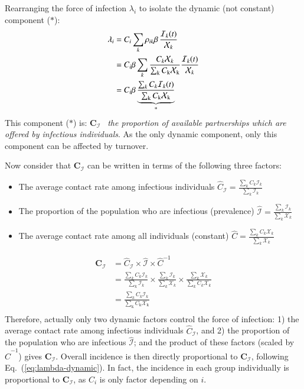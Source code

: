 Rearranging the force of infection $\lambda_i$
to isolate the dynamic (not constant) component ($*$):
\begin{equation}\label{eq:lambda-dynamic}
\begin{aligned}
  \lambda_i
    &= C_i \sum_k \rho_{ik} \beta \thinspace \frac{\mathcal{I}_k(t)}{\mathcal{X}_k}\\
    &= C_i \beta \sum_k
    \frac{C_k \mathcal{X}_k}{\sum_{\mathrm{k}}C_{\mathrm{k}}\mathcal{X}_{\mathrm{k}}}
    \frac{\mathcal{I}_k(t)}{\mathcal{X}_k}\\
    &= C_i \beta \underbrace{
      \frac{\sum_k C_k \mathcal{I}_k(t)}{\sum_{\mathrm{k}}C_{\mathrm{k}}\mathcal{X}_{\mathrm{k}}}
    }_{\text{*}}
\end{aligned}
\end{equation}
This component ($*$) is:
$\bm{C}_{\mathcal{I}}$~%
\textit{the proportion of available partnerships which are offered by infectious individuals}.
As the only dynamic component, only this component can be affected by turnover.
\par
Now consider that $\bm{C}_{\mathcal{I}}$
can be written in terms of the following three factors:
\begin{itemize}
  \item The average contact rate among infectious individuals
  $\hat{C}_{\mathcal{I}} = \frac{\sum_k C_k \mathcal{I}_k}{\sum_k \mathcal{I}_k}$
  \item The proportion of the population who are infectious (prevalence)
  $\hat{\mathcal{I}} = \frac{\sum_k \mathcal{I}_k}{\sum_k \mathcal{X}_k}$
  \item The average contact rate among all individuals (constant)
  $\hat{C} = \frac{\sum_k C_k \mathcal{X}_k}{\sum_k \mathcal{X}_k}$
\end{itemize}
\begin{equation}
\begin{aligned}
\bm{C}_{\mathcal{I}}
&= \hat{C}_{\mathcal{I}} \times \hat{\mathcal{I}} \times \hat{C}^{-1}\\
&= \frac{\sum_k C_k \mathcal{I}_k}{\sum_k \mathcal{I}_k}
\times
\frac{\sum_k \mathcal{I}_k}{\sum_k \mathcal{X}_k}
\times
\frac{\sum_k \mathcal{X}_k}{\sum_k C_k \mathcal{X}_k}\\
&= \frac{\sum_k C_k \mathcal{I}_k}{\sum_{\mathrm{k}}C_{\mathrm{k}}\mathcal{X}_{\mathrm{k}}}\\
\end{aligned}
\end{equation}
Therefore, actually only two dynamic factors control the force of infection:
1) the average contact rate among infectious individuals $\hat{C}_{\mathcal{I}}$, and
2) the proportion of the population who are infectious $\hat{\mathcal{I}}$;
and the product of these factors (scaled by $\hat{C}^{-1}$) gives $\bm{C}_{\mathcal{I}}$.
Overall incidence is then directly proportional to $\bm{C}_{\mathcal{I}}$,
following Eq.~(\ref{eq:lambda-dynamic}).
In fact, the incidence in each group individually is proportional to $\bm{C}_{\mathcal{I}}$,
as $C_i$ is only factor depending on $i$.